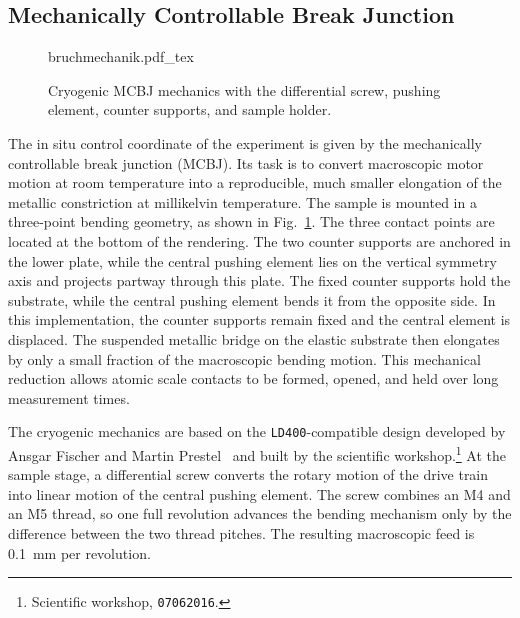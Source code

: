     \newpage
    \subsection{Mechanically Controllable Break Junction}
    \label{subsec:setup:mcbj}

        \begin{figure}
            \captionsetup{format=plain}%
            \centering
            \vspace{-.8em}
            {bruchmechanik.pdf_tex}
            \caption{Cryogenic MCBJ mechanics with the differential screw, pushing element, counter supports, and sample holder.}
            \label{fig:setup:bruchmechanik}
        \end{figure}

        The in situ control coordinate of the experiment is given by the mechanically controllable break junction (MCBJ). Its task is to convert macroscopic motor motion at room temperature into a reproducible, much smaller elongation of the metallic constriction at millikelvin temperature. The sample is mounted in a three-point bending geometry, as shown in Fig.~\ref{fig:setup:bruchmechanik}. The three contact points are located at the bottom of the rendering. The two counter supports are anchored in the lower plate, while the central pushing element lies on the vertical symmetry axis and projects partway through this plate. The fixed counter supports hold the substrate, while the central pushing element bends it from the opposite side. In this implementation, the counter supports remain fixed and the central element is displaced. The suspended metallic bridge on the elastic substrate then elongates by only a small fraction of the macroscopic bending motion. This mechanical reduction allows atomic scale contacts to be formed, opened, and held over long measurement times.

        The cryogenic mechanics are based on the \texttt{LD400}-compatible design developed by Ansgar Fischer and Martin Prestel~\cite{prestel_magnetic_2020} and built by the scientific workshop.\footnote{Scientific workshop, \texttt{07062016}.} At the sample stage, a differential screw converts the rotary motion of the drive train into linear motion of the central pushing element. The screw combines an M4 and an M5 thread, so one full revolution advances the bending mechanism only by the difference between the two thread pitches. The resulting macroscopic feed is \qty{0.1}{\milli\meter} per revolution.

